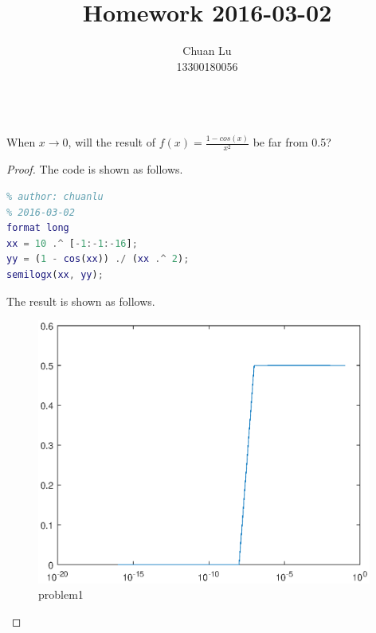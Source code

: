 \documentclass[12pt]{article}
\newenvironment{problem}[2][Problem]{\begin{trivlist}
\item[\hskip \labelsep {\bfseries #1}\hskip \labelsep {\bfseries #2.}]}{\end{trivlist}}
\begin{document}
 
\title{Homework 2016-03-02}
\author{Chuan Lu\\ 
13300180056}
 
\maketitle
 
\begin{problem}{1}
\text{ }\\
When $x \to 0$, will the result of $f(x) = \frac{1 - cos(x)}{x ^{2}}$ be far from 0.5?
\end{problem}
\begin{proof}
The code is shown as follows.
\begin{lstlisting}[language={MATLAB}]
% homework1
% author: chuanlu
% 2016-03-02
format long
xx = 10 .^ [-1:-1:-16];
yy = (1 - cos(xx)) ./ (xx .^ 2);
semilogx(xx, yy);    
\end{lstlisting}
The result is shown as follows.
\begin{figure}[h!]
	\centering
    \includegraphics[width=11cm]{figure/problem1.eps}
    \caption{problem1}
    \label{problem1}
\end{figure}
\end{proof}
\end{document}

